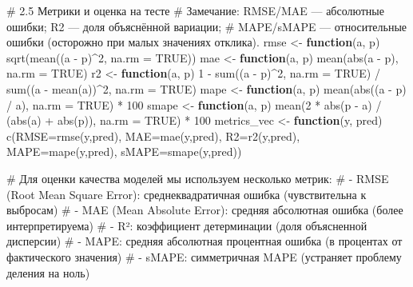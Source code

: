 \documentclass[
  letterpaper,
  DIV=11,
  numbers=noendperiod]{scrreprt}
\newenvironment{Shaded}{\begin{snugshade}}{\end{snugshade}}
\newcommand{\AttributeTok}[1]{\textcolor[rgb]{0.40,0.45,0.13}{#1}}
\newcommand{\CommentTok}[1]{\textcolor[rgb]{0.37,0.37,0.37}{#1}}
\newcommand{\ConstantTok}[1]{\textcolor[rgb]{0.56,0.35,0.01}{#1}}
\newcommand{\ControlFlowTok}[1]{\textcolor[rgb]{0.00,0.23,0.31}{\textbf{#1}}}
\newcommand{\DecValTok}[1]{\textcolor[rgb]{0.68,0.00,0.00}{#1}}
\newcommand{\FunctionTok}[1]{\textcolor[rgb]{0.28,0.35,0.67}{#1}}
\newcommand{\NormalTok}[1]{\textcolor[rgb]{0.00,0.23,0.31}{#1}}
\newcommand{\OtherTok}[1]{\textcolor[rgb]{0.00,0.23,0.31}{#1}}
\newcommand{\SpecialCharTok}[1]{\textcolor[rgb]{0.37,0.37,0.37}{#1}}
\begin{document}
\begin{Shaded}
\begin{Highlighting}[]
\CommentTok{\# 2.5 Метрики и оценка на тесте}
\CommentTok{\# Замечание: RMSE/MAE — абсолютные ошибки; R2 — доля объяснённой вариации;}
\CommentTok{\# MAPE/sMAPE — относительные ошибки (осторожно при малых значениях отклика).}
\NormalTok{rmse  }\OtherTok{\textless{}{-}} \ControlFlowTok{function}\NormalTok{(a, p) }\FunctionTok{sqrt}\NormalTok{(}\FunctionTok{mean}\NormalTok{((a }\SpecialCharTok{{-}}\NormalTok{ p)}\SpecialCharTok{\^{}}\DecValTok{2}\NormalTok{, }\AttributeTok{na.rm =} \ConstantTok{TRUE}\NormalTok{))}
\NormalTok{mae   }\OtherTok{\textless{}{-}} \ControlFlowTok{function}\NormalTok{(a, p) }\FunctionTok{mean}\NormalTok{(}\FunctionTok{abs}\NormalTok{(a }\SpecialCharTok{{-}}\NormalTok{ p), }\AttributeTok{na.rm =} \ConstantTok{TRUE}\NormalTok{)}
\NormalTok{r2    }\OtherTok{\textless{}{-}} \ControlFlowTok{function}\NormalTok{(a, p) }\DecValTok{1} \SpecialCharTok{{-}} \FunctionTok{sum}\NormalTok{((a }\SpecialCharTok{{-}}\NormalTok{ p)}\SpecialCharTok{\^{}}\DecValTok{2}\NormalTok{, }\AttributeTok{na.rm =} \ConstantTok{TRUE}\NormalTok{) }\SpecialCharTok{/} \FunctionTok{sum}\NormalTok{((a }\SpecialCharTok{{-}} \FunctionTok{mean}\NormalTok{(a))}\SpecialCharTok{\^{}}\DecValTok{2}\NormalTok{, }\AttributeTok{na.rm =} \ConstantTok{TRUE}\NormalTok{)}
\NormalTok{mape  }\OtherTok{\textless{}{-}} \ControlFlowTok{function}\NormalTok{(a, p) }\FunctionTok{mean}\NormalTok{(}\FunctionTok{abs}\NormalTok{((a }\SpecialCharTok{{-}}\NormalTok{ p) }\SpecialCharTok{/}\NormalTok{ a), }\AttributeTok{na.rm =} \ConstantTok{TRUE}\NormalTok{) }\SpecialCharTok{*} \DecValTok{100}
\NormalTok{smape }\OtherTok{\textless{}{-}} \ControlFlowTok{function}\NormalTok{(a, p) }\FunctionTok{mean}\NormalTok{(}\DecValTok{2} \SpecialCharTok{*} \FunctionTok{abs}\NormalTok{(p }\SpecialCharTok{{-}}\NormalTok{ a) }\SpecialCharTok{/}\NormalTok{ (}\FunctionTok{abs}\NormalTok{(a) }\SpecialCharTok{+} \FunctionTok{abs}\NormalTok{(p)), }\AttributeTok{na.rm =} \ConstantTok{TRUE}\NormalTok{) }\SpecialCharTok{*} \DecValTok{100}
\NormalTok{metrics\_vec }\OtherTok{\textless{}{-}} \ControlFlowTok{function}\NormalTok{(y, pred) }\FunctionTok{c}\NormalTok{(}\AttributeTok{RMSE=}\FunctionTok{rmse}\NormalTok{(y,pred), }\AttributeTok{MAE=}\FunctionTok{mae}\NormalTok{(y,pred), }\AttributeTok{R2=}\FunctionTok{r2}\NormalTok{(y,pred),}
                                   \AttributeTok{MAPE=}\FunctionTok{mape}\NormalTok{(y,pred), }\AttributeTok{sMAPE=}\FunctionTok{smape}\NormalTok{(y,pred))}

\CommentTok{\# Для оценки качества моделей мы используем несколько метрик:}
\CommentTok{\#   {-} RMSE (Root Mean Square Error): среднеквадратичная ошибка (чувствительна к выбросам)}
\CommentTok{\#   {-} MAE (Mean Absolute Error): средняя абсолютная ошибка (более интерпретируема)}
\CommentTok{\#   {-} R²: коэффициент детерминации (доля объясненной дисперсии)}
\CommentTok{\#   {-} MAPE: средняя абсолютная процентная ошибка (в процентах от фактического значения)}
\CommentTok{\#   {-} sMAPE: симметричная MAPE (устраняет проблему деления на ноль) }


\end{Highlighting}
\end{Shaded}
\end{document}
